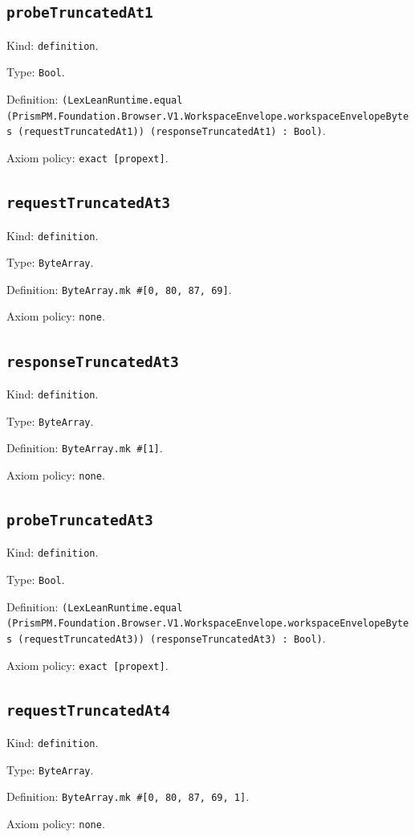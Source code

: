 \documentclass[11pt]{article}
\begin{document}
\subsection*{\texttt{probeTruncatedAt1}}
\noindent Kind: \texttt{definition}.\par
\noindent Type: \texttt{Bool}.\par
\noindent Definition: \texttt{(LexLeanRuntime.equal (PrismPM.Foundation.Browser.V1.WorkspaceEnvelope.workspaceEnvelopeBytes (requestTruncatedAt1)) (responseTruncatedAt1) : Bool)}.\par
\noindent Axiom policy: \texttt{exact [propext]}.\par
\subsection*{\texttt{requestTruncatedAt3}}
\noindent Kind: \texttt{definition}.\par
\noindent Type: \texttt{ByteArray}.\par
\noindent Definition: \texttt{ByteArray.mk \#[0, 80, 87, 69]}.\par
\noindent Axiom policy: \texttt{none}.\par
\subsection*{\texttt{responseTruncatedAt3}}
\noindent Kind: \texttt{definition}.\par
\noindent Type: \texttt{ByteArray}.\par
\noindent Definition: \texttt{ByteArray.mk \#[1]}.\par
\noindent Axiom policy: \texttt{none}.\par
\subsection*{\texttt{probeTruncatedAt3}}
\noindent Kind: \texttt{definition}.\par
\noindent Type: \texttt{Bool}.\par
\noindent Definition: \texttt{(LexLeanRuntime.equal (PrismPM.Foundation.Browser.V1.WorkspaceEnvelope.workspaceEnvelopeBytes (requestTruncatedAt3)) (responseTruncatedAt3) : Bool)}.\par
\noindent Axiom policy: \texttt{exact [propext]}.\par
\subsection*{\texttt{requestTruncatedAt4}}
\noindent Kind: \texttt{definition}.\par
\noindent Type: \texttt{ByteArray}.\par
\noindent Definition: \texttt{ByteArray.mk \#[0, 80, 87, 69, 1]}.\par
\noindent Axiom policy: \texttt{none}.\par
\end{document}
